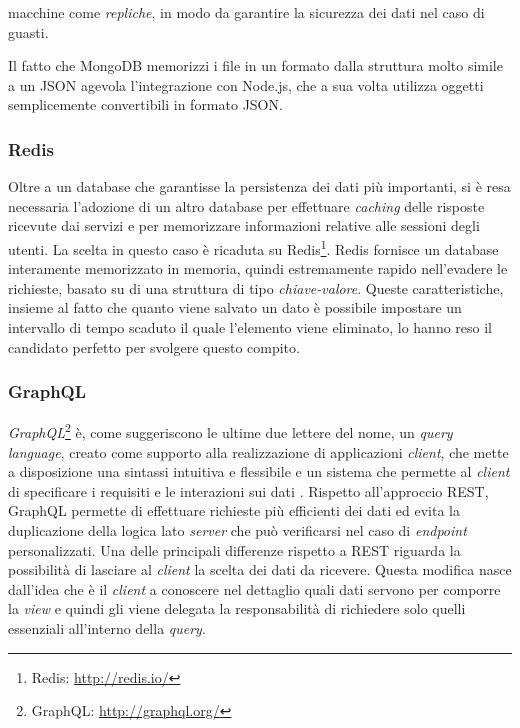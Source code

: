 macchine come \emph{repliche}, in modo da garantire la sicurezza dei dati nel caso di guasti.

Il fatto che MongoDB memorizzi i file in un formato dalla struttura molto simile a un JSON agevola l'integrazione con Node.js, che a sua volta utilizza oggetti semplicemente convertibili in formato JSON.

\subsubsection{Redis}

Oltre a un database che garantisse la persistenza dei dati più importanti, si è resa necessaria l'adozione di un altro database per effettuare  \emph{caching} delle risposte ricevute dai servizi e per memorizzare informazioni relative alle sessioni degli utenti. La scelta in questo caso è ricaduta su Redis\footnote{Redis: \url{http://redis.io/}}. Redis fornisce un database interamente memorizzato in memoria, quindi estremamente rapido nell'evadere le richieste, basato su di una struttura di tipo \emph{chiave-valore}. Queste caratteristiche, insieme al fatto che quanto viene salvato un dato è possibile impostare un intervallo di tempo scaduto il quale l'elemento viene eliminato, lo hanno reso il candidato perfetto per svolgere questo compito.

\subsubsection{GraphQL\label{sec:graphql-introduzione}}

\emph{GraphQL}\footnote{GraphQL: \url{http://graphql.org/}} è, come suggeriscono le ultime due lettere del nome, un \emph{query language}, creato come supporto alla realizzazione di applicazioni \emph{client}, che mette a disposizione una sintassi intuitiva e flessibile e un sistema che permette al \emph{client} di specificare i requisiti e le interazioni sui dati \cite{website:graphql-specs}. Rispetto all'approccio REST, GraphQL permette di effettuare richieste più efficienti dei dati ed evita la duplicazione della logica lato \emph{server} che può verificarsi nel caso di \emph{endpoint} personalizzati. Una delle principali differenze rispetto a REST riguarda la possibilità di lasciare al \emph{client} la scelta dei dati da ricevere. Questa modifica nasce dall'idea che è il \emph{client} a conoscere nel dettaglio quali dati servono per comporre la \emph{view} e quindi gli viene delegata la responsabilità di richiedere solo quelli essenziali all'interno della \emph{query}.

